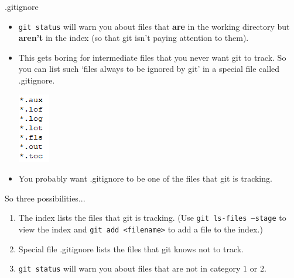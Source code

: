\documentclass[usenames,dvipsnames]{beamer}
\newcommand{\code}[1]{\colorbox{light-gray}{\texttt{#1}}}
\begin{document}
\begin{frame}{.gitignore}
  \begin{block}{}
    \begin{itemize}
      \item{\code{git status} will warn you about files that \textbf{are} in the working directory but \textbf{aren't} in the index (so that git isn't paying attention to them).}
      \item{This gets boring for intermediate files that you never want git to track. So you can list such `files always to be ignored by git' in a special file called .gitignore.
    {\begin{center}
     \includegraphics[scale=0.8]{gitignore.png}
   \end{center}}}
      \item{You probably want .gitignore to be one of the files that git is tracking.}
    \end{itemize}
  \end{block}
\end{frame}

\begin{frame}{So three possibilities...}
  \begin{block}{}
    \begin{enumerate}
      \item{The index lists the files that git is tracking. (Use \code{git ls-files --stage} to view the index and \code{git add <filename>} to add a file to the index.)}
      \vspace{5 mm}
      \item{Special file .gitignore lists the files that git knows not to track.}
      \vspace{5 mm}
      \item{\code{git status} will warn you about files that are not in category $1$ or $2$.}
    \end{enumerate}
  \end{block}
\end{frame}
\end{document}
